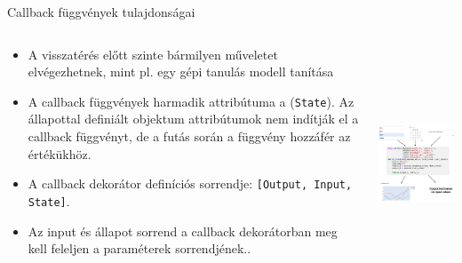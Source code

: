 \documentclass[english, aspectratio=169]{beamer}
\begin{document}
\begin{frame}{Callback függvények tulajdonságai}
	\begin{columns}
		\begin{column}{.5\textwidth}
			\begin{itemize}
				\item A visszatérés előtt szinte bármilyen műveletet elvégezhetnek, mint pl. egy gépi tanulás modell tanítása
				\item A callback függvények harmadik attribútuma a (\texttt{State}). Az állapottal definiált objektum attribútumok nem indítják el a callback függvényt, de a futás során a függvény hozzáfér az értékükhöz.
				\item A callback dekorátor definíciós sorrendje: \texttt{[Output, Input, State]}.
				\item Az input és állapot sorrend a callback dekorátorban meg kell feleljen a paraméterek sorrendjének.. 
			\end{itemize}
		\end{column}
		\begin{column}{.5\textwidth}
			\includegraphics[height=7cm, width=7cm, keepaspectratio]{images/dash_15.png}
		\end{column}
	\end{columns}
\end{frame}
\end{document}
